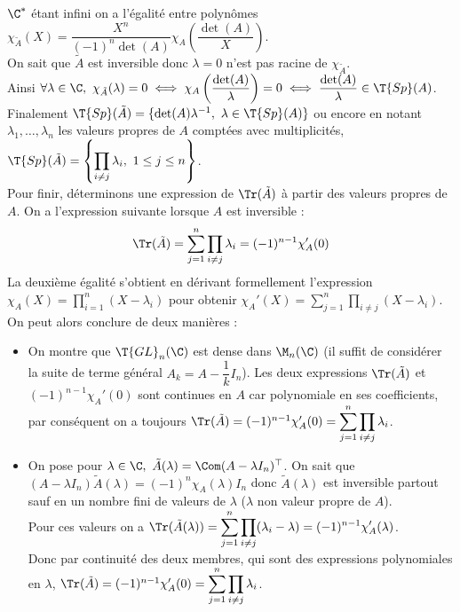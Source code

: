 \documentclass[8pt]{book}
\begin{document}
	$\C^*$ étant infini on a l'égalité entre polynômes $\chi_{\tilde A}(X)=\dfrac{X^n}{(-1)^n\det(A)}\chi_A\left(\dfrac{\det(A)}{X}\right)$.\\
	On sait que $\tilde A$ est inversible donc $\lambda=0$ n'est pas racine de $\chi_{\tilde A}$.\\
	Ainsi $\forall \lambda\in \C,\ \chi_{\tilde A}(\lambda)=0\iff \chi_A\left(\dfrac{\det(A)}{\lambda}\right)=0\iff \dfrac{\det(A)}{\lambda}\in \T{Sp}(A)$.\\
	Finalement $\T{Sp}(\tilde A)=\{\det(A)\lambda^{-1},\ \lambda\in \T{Sp}(A)\}$ ou encore en notant $\lambda_1,\dots,\lambda_n$ les valeurs propres de $A$ comptées avec multiplicités, $\T{Sp}(\tilde A)=\left\{\displaystyle\prod_{i\ne j}\lambda_i,\ 1\leq j\leq n\right\}$.\\
	Pour finir, déterminons une	expression de $\Tr(\tilde A)$ à partir des valeurs propres de $A$. On a l'expression suivante lorsque $A$ est inversible :
	$$\Tr(\tilde A)=\sum_{j=1}^n\prod_{i\ne j}\lambda_i=(-1)^{n-1}\chi_A'(0)$$
	La deuxième égalité s'obtient en dérivant formellement l'expression $\chi_A(X)=\displaystyle\prod_{i=1}^n(X-\lambda_i)$ pour obtenir $\chi_A'(X)=\displaystyle\sum_{j=1}^n\prod_{i\ne j}(X-\lambda_i)$.\\
	On peut alors conclure de deux manières :
	\begin{itemize}
		\item On montre que $\T{GL}_n(\C)$ est dense dans $\M_n(\C)$ (il suffit de considérer la suite de terme général $A_k=A-\dfrac{1}{k}I_n$). Les deux expressions $\Tr(\tilde A)$ et $(-1)^{n-1}\chi_A'(0)$ sont continues en $A$ car polynomiale en ses coefficients, par conséquent on a toujours $\Tr(\tilde A)=(-1)^{n-1}\chi_A'(0)=\displaystyle\sum_{j=1}^n\prod_{i\ne j}\lambda_i$.
		\item On pose pour $\lambda\in \C,\ \tilde A(\lambda)=\Com(A-\lambda I_n)^\top$. On sait que $(A-\lambda I_n)\tilde A(\lambda)=(-1)^n\chi_A(\lambda)I_n$ donc $\tilde A(\lambda)$ est inversible partout sauf en un nombre fini de valeurs de $\lambda$ ($\lambda$ non valeur propre de $A$).\\
		Pour ces valeurs on a $\Tr(\tilde A(\lambda))=\displaystyle\sum_{j=1}^n\prod_{i\ne j}(\lambda_i-\lambda)=(-1)^{n-1}\chi_A'(\lambda)$.\\
		Donc par continuité des deux membres, qui sont des expressions polynomiales en $\lambda$, $\Tr(\tilde A)=(-1)^{n-1}\chi_A'(0)=\displaystyle\sum_{j=1}^n\prod_{i\ne j}\lambda_i$.
	\end{itemize}
	
\end{document}
